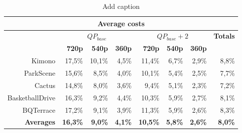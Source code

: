 \begin{table}[htbp]
  \centering
  \caption{Add caption}
    \begin{tabular}{r|rrr|rrr|r}
    \toprule
    \multicolumn{8}{c}{\textbf{Average costs}} \\
    \midrule
       & \multicolumn{3}{c|}{\textbf{$QP_{base}$}} & \multicolumn{3}{c|}{\textbf{$QP_{base}+2$}} & \multicolumn{1}{c}{\textbf{Totals}} \\
       & \textbf{720p} & \textbf{540p} & \textbf{360p} & \textbf{720p} & \textbf{540p} & \textbf{360p} &  \\
    Kimono & 17,5\% & 10,1\% & 4,5\% & 11,4\% & 6,7\% & 2,9\% & 8,8\% \\
    ParkScene & 15,6\% & 8,5\% & 4,0\% & 10,1\% & 5,4\% & 2,5\% & 7,7\% \\
    Cactus & 14,8\% & 8,0\% & 3,6\% & 9,4\% & 5,1\% & 2,3\% & 7,2\% \\
    BasketballDrive & 16,3\% & 9,2\% & 4,4\% & 10,3\% & 5,9\% & 2,7\% & 8,1\% \\
    BQTerrace & 17,2\% & 9,1\% & 3,9\% & 11,3\% & 5,9\% & 2,6\% & 8,3\% \\
    \textbf{Averages} & \textbf{16,3\%} & \textbf{9,0\%} & \textbf{4,1\%} & \textbf{10,5\%} & \textbf{5,8\%} & \textbf{2,6\%} & \textbf{8,0\%} \\
    \bottomrule
    \end{tabular}%
  \label{tab:addlabel}%
\end{table}%
